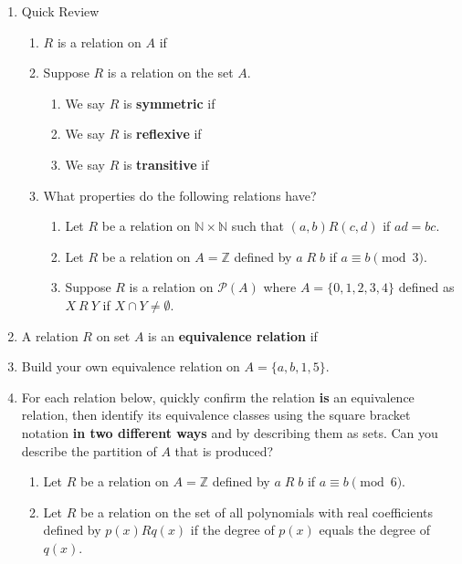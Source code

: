 \documentclass[12pt]{article}
\renewcommand{\emph}[1]{\textsf{\textbf{#1}}}
\newcommand{\N}{\mathbb{N}}
\newcommand{\Z}{\mathbb{Z}}
\begin{document}
\begin{enumerate}
\item Quick Review
\vspace*{-0.5cm}
	\begin{enumerate}
	\item $R$ is a relation on $A$ if
	
	\item Suppose $R$ is a relation on the set $A.$
		\begin{enumerate}
		\item We say $R$ is \emph{symmetric} if \\
		\item We say $R$ is \emph{reflexive} if \\
		\item We say $R$ is \emph{transitive} if \\
		\end{enumerate}
	\item What properties do the following relations have?
		\begin{enumerate}
		\item Let $R$ be a relation on $\N \times \N$ such that $(a,b) R (c,d)$ if $ad=bc.$
		\vfill
		\item Let $R$ be a relation on $A=\Z$ defined by $a \;R\; b$ if $a \equiv b \pmod 3.$ 
	\vfill
		\item Suppose $R$ is a relation on $\mathcal{P}(A)$ where $A=\{0,1,2,3,4\}$ defined as $X \: R \: Y$ if $X \cap Y \not = \emptyset.$\\
		\vfill
		\end{enumerate}
	\end{enumerate}
\item A relation $R$ on set $A$ is an \textbf{equivalence relation} if \\
	\vfill
	\vfill
\item Build your own equivalence relation on $A=\{a,b,1,5\}.$
\vfill
\vfill
\newpage
\item For each relation below, quickly confirm the relation \emph{is} an equivalence relation, then identify its equivalence classes using the square bracket notation \emph{in two different ways} and by describing them as sets. Can you describe the partition of $A$ that is produced?
	\begin{enumerate}
	\item Let $R$ be a relation on $A=\Z$ defined by $a \;R\; b$ if $a \equiv b \pmod 6.$
	\vfill
	\item Let $R$ be a relation on the set of all polynomials with real coefficients defined by $p(x) R q(x)$ if the degree of $p(x)$ equals the degree of $q(x).$

\end{enumerate}
\end{enumerate}
\end{document}
